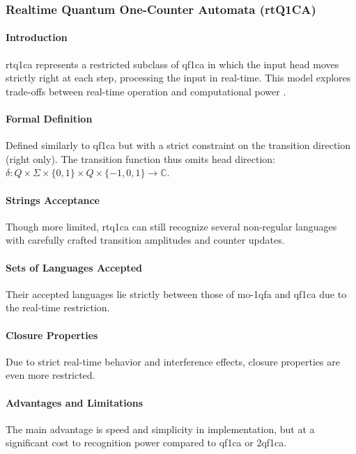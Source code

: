 \subsubsection{Realtime Quantum One-Counter Automata (rtQ1CA)}

\paragraph{Introduction}
\gls{rtq1ca} represents a restricted subclass of \gls{qf1ca} in which the input head moves strictly right at each step, processing the input in real-time. This model explores trade-offs between real-time operation and computational power \cite{cem2012quantum}.

\paragraph{Formal Definition}
Defined similarly to \gls{qf1ca} but with a strict constraint on the transition direction (right only). The transition function thus omits head direction: $\delta: Q \times \Sigma \times \{0,1\} \times Q \times \{-1,0,1\} \rightarrow \mathbb{C}$.

\paragraph{Strings Acceptance}
Though more limited, \gls{rtq1ca} can still recognize several non-regular languages with carefully crafted transition amplitudes and counter updates.

\paragraph{Sets of Languages Accepted}
Their accepted languages lie strictly between those of \gls{mo-1qfa} and \gls{qf1ca} due to the real-time restriction.

\paragraph{Closure Properties}
Due to strict real-time behavior and interference effects, closure properties are even more restricted.

\paragraph{Advantages and Limitations}
The main advantage is speed and simplicity in implementation, but at a significant cost to recognition power compared to \gls{qf1ca} or \gls{2qf1ca}.

